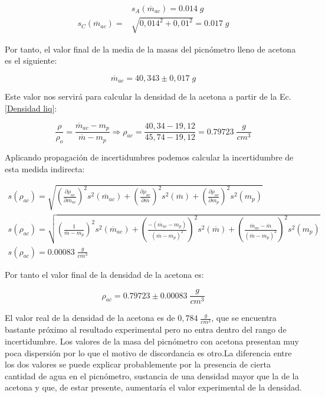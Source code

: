 \documentclass[a4paper,12pt,titlepage]{report}
\begin{document}
\begin{align}
    &s_{A}(\overline{m}_{ac}) = 0.014 \; g \\
    s_{C}(\overline{m}_{ac}) = &\sqrt{0,014^2 + 0,01^2} = 0.017 \; g
\end{align}

Por tanto, el valor final de la media de la masas del picnómetro lleno de acetona es el siguiente:

\begin{equation}
    \overline{m}_{ac} = 40,343 \pm 0,017 \; g
\end{equation}

Este valor nos servirá para calcular la densidad de la acetona a partir de la Ec.\ref{Densidad liq}:

\begin{equation}
    \frac{\rho}{\rho_o}=\frac{\overline{m}_{ac}-m_{p}}{\overline{m}-m_{p}} \Rightarrow \rho_{ac} = \frac{40,34-19,12}{45,74-19,12} = 0.79723 \; \frac{g}{cm^3}
\end{equation}

Aplicando propagación de incertidumbres podemos calcular la incertidumbre de esta medida indirecta:

\begin{gather}
    s(\rho_{ac}) = \sqrt{\left (\frac{\partial \rho_{ac}}{\partial \overline{m}_{ac}} \right )^2 s^2(\overline{m}_{ac})  +  \left (\frac{\partial \rho_{ac}}{\partial \overline{m}} \right )^2 s^2(\overline{m})  +  \left (\frac{\partial \rho_{ac}}{\partial m_{p}} \right )^2 s^2(m_{p})} \\
    s(\rho_{ac}) = \sqrt{\left (\frac{1}{\overline{m}-m_{p}} \right )^2 s^2(\overline{m}_{ac})  +  \left (\frac{-(\overline{m}_{ac}-m_{p})}{(\overline{m}-m_{p})^2} \right )^2 s^2(\overline{m})  +  \left (\frac{\overline{m}_{ac}-\overline{m}}{(\overline{m}-m_{p})^2} \right )^2 s^2(m_{p})} \nonumber  \\
    s(\rho_{ac}) = 0.00083 \; \frac{g}{cm^3} \nonumber
    \label{Inceridumbre densidad liq}
\end{gather}

Por tanto el valor final de la densidad de la acetona es:

\begin{equation}
    \rho_{ac} = 0.79723 \pm 0.00083 \; \frac{g}{cm^3}
\end{equation}

El valor real de la densidad de la acetona es de $0,784 \; \frac{g}{cm^3}$, que se encuentra bastante próximo al resultado experimental pero no entra dentro del rango de incertidumbre. Los valores de la masa del picnómetro con acetona presentan muy poca dispersión por lo que el motivo de discordancia es otro.La diferencia entre los dos valores se puede explicar probablemente por la presencia de cierta cantidad de agua en el picnómetro, sustancia de una densidad mayor que la de la acetona y que, de estar presente, aumentaría el valor experimental de la densidad. 
\end{document}
